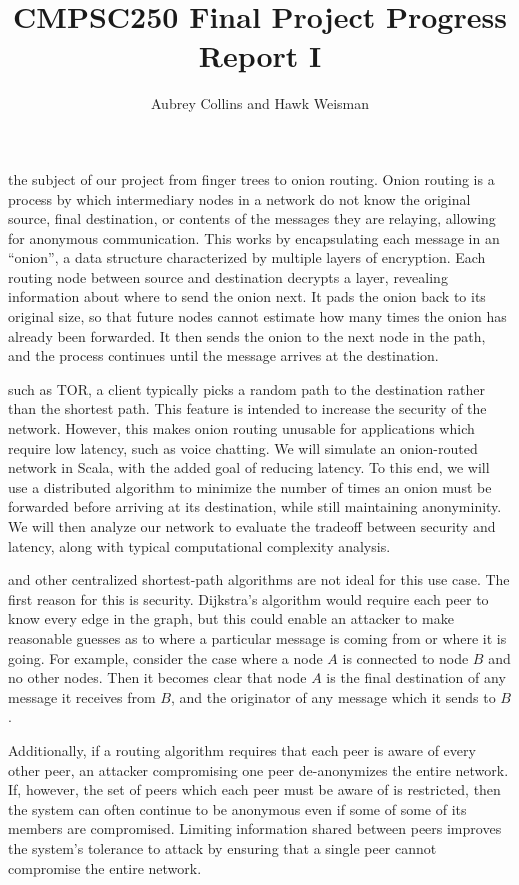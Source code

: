 \documentclass[a4paper,nobib]{tufte-handout}
\title{CMPSC250 Final Project Progress Report I}
\author{Aubrey Collins and Hawk Weisman}
\begin{document}
\maketitle

 the subject of our project from finger trees to onion routing. Onion routing is a process by which intermediary nodes in a network do not know the original source, final destination, or contents of the messages they are relaying, allowing for anonymous communication. This works by encapsulating each message in an ``onion'', a data structure characterized by multiple layers of encryption. Each routing node between source and destination decrypts a layer, revealing information about where to send the onion next. It pads the onion back to its original size, so that future nodes cannot estimate how many times the onion has already been forwarded. It then sends the onion to the next node in the path, and the process continues until the message arrives at the destination.

 such as TOR, a client typically picks a random path to the destination rather than the shortest path. This feature is intended to increase the security of the network. However, this makes onion routing unusable for applications which require low latency, such as voice chatting. We will simulate an onion-routed network in Scala, with the added goal of reducing latency. To this end, we will use a distributed algorithm to minimize the number of times an onion must be forwarded before arriving at its destination, while still maintaining anonyminity. We will then analyze our network to evaluate the tradeoff between security and latency, along with typical computational complexity analysis.


 and other centralized shortest-path algorithms are not ideal for this use case. The first reason for this is security. Dijkstra’s algorithm would require each peer to know every edge in the graph, but this could enable an attacker to make reasonable guesses as to where a particular message is coming from or where it is going. For example, consider the case where a node $A$ is connected to node $B$ and no other nodes. Then it becomes clear that node $A$ is the final destination of any message it receives from $B$, and the originator of any message which it sends to $B$.

Additionally, if a routing algorithm requires that each peer is aware of every other peer, an attacker compromising one peer de-anonymizes the entire network. If, however, the set of peers which each peer must be aware of is restricted,  then the system can often continue to be anonymous even if some of some of its members are compromised. Limiting information shared between peers improves the system's tolerance to attack by ensuring that a single peer cannot compromise the entire network.
\end{document}
